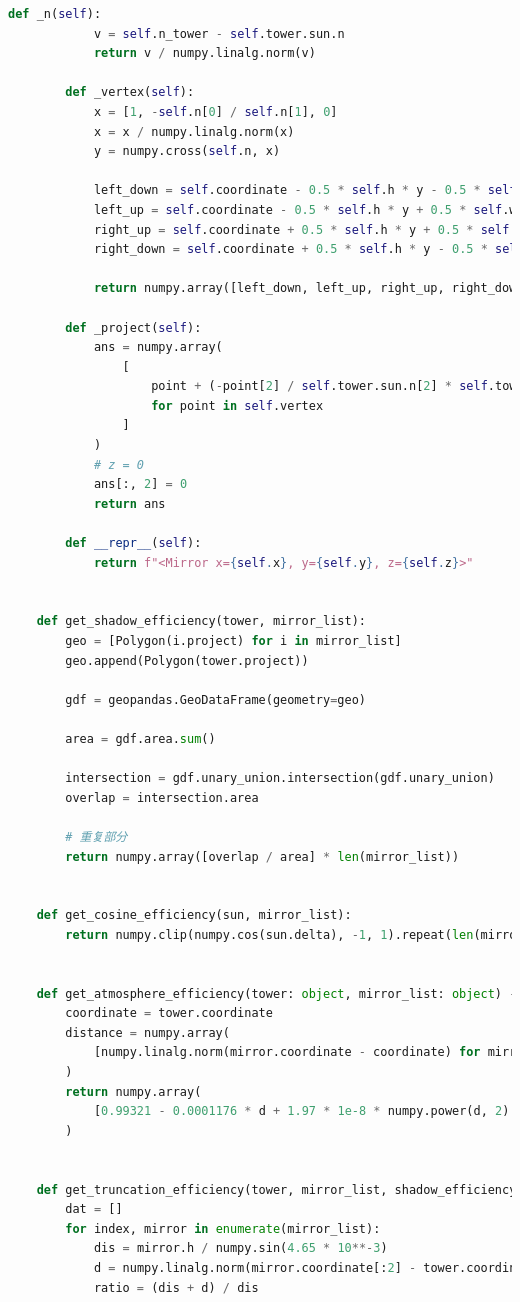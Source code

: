 \documentclass[withoutpreface,bwprint]{cumcmthesis} %
\begin{document}
\begin{appendices}
\begin{lstlisting}[language=python]
        def _n(self):
            v = self.n_tower - self.tower.sun.n
            return v / numpy.linalg.norm(v)
    
        def _vertex(self):
            x = [1, -self.n[0] / self.n[1], 0]
            x = x / numpy.linalg.norm(x)
            y = numpy.cross(self.n, x)
    
            left_down = self.coordinate - 0.5 * self.h * y - 0.5 * self.w * x
            left_up = self.coordinate - 0.5 * self.h * y + 0.5 * self.w * x
            right_up = self.coordinate + 0.5 * self.h * y + 0.5 * self.w * x
            right_down = self.coordinate + 0.5 * self.h * y - 0.5 * self.w * x
    
            return numpy.array([left_down, left_up, right_up, right_down])
    
        def _project(self):
            ans = numpy.array(
                [
                    point + (-point[2] / self.tower.sun.n[2] * self.tower.sun.n)
                    for point in self.vertex
                ]
            )
            # z = 0
            ans[:, 2] = 0
            return ans
    
        def __repr__(self):
            return f"<Mirror x={self.x}, y={self.y}, z={self.z}>"
    
    
    def get_shadow_efficiency(tower, mirror_list):
        geo = [Polygon(i.project) for i in mirror_list]
        geo.append(Polygon(tower.project))
    
        gdf = geopandas.GeoDataFrame(geometry=geo)
    
        area = gdf.area.sum()
    
        intersection = gdf.unary_union.intersection(gdf.unary_union)
        overlap = intersection.area
    
        # 重复部分
        return numpy.array([overlap / area] * len(mirror_list))
    
    
    def get_cosine_efficiency(sun, mirror_list):
        return numpy.clip(numpy.cos(sun.delta), -1, 1).repeat(len(mirror_list))
    
    
    def get_atmosphere_efficiency(tower: object, mirror_list: object) -> numpy.array:
        coordinate = tower.coordinate
        distance = numpy.array(
            [numpy.linalg.norm(mirror.coordinate - coordinate) for mirror in mirror_list]
        )
        return numpy.array(
            [0.99321 - 0.0001176 * d + 1.97 * 1e-8 * numpy.power(d, 2) for d in distance]
        )
    
    
    def get_truncation_efficiency(tower, mirror_list, shadow_efficiency):
        dat = []
        for index, mirror in enumerate(mirror_list):
            dis = mirror.h / numpy.sin(4.65 * 10**-3)
            d = numpy.linalg.norm(mirror.coordinate[:2] - tower.coordinate[:2])
            ratio = (dis + d) / dis
    

\end{lstlisting}
\end{appendices}
\end{document}
